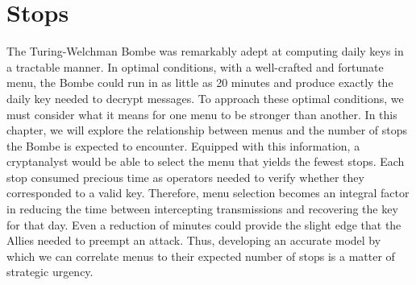 \chapter{Stops}
The Turing-Welchman Bombe was remarkably adept at computing daily
keys in a tractable manner. In optimal conditions,
with a well-crafted and fortunate menu, the Bombe could run in as
little as 20 minutes and produce exactly the daily key needed to
decrypt messages.
To approach these optimal conditions, we must consider what it means
for one menu to be stronger than another. In this chapter, we will
explore the relationship
between menus and the number of stops the Bombe is expected to
encounter. Equipped with this information, a cryptanalyst would be
able to select the menu
that yields the fewest stops. Each stop consumed precious
time as operators needed to verify whether they corresponded to a
valid key. Therefore, menu selection becomes an integral factor
in reducing the time between intercepting transmissions and
recovering the key for that day. Even a reduction of minutes could
provide the slight edge that the Allies needed to preempt an attack.
Thus, developing an accurate model by which we can correlate menus to
their expected number of stops is a matter of strategic urgency.

